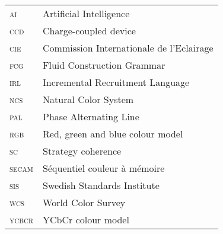 \label{abbreviations}

\setlength{\parindent}{0pt}

\begin{tabular}{ll}
\textsc{ai} &  Artificial Intelligence\\
\textsc{ccd} &  Charge-coupled device\\
\textsc{cie} &  Commission Internationale de l'Eclairage\\
\textsc{fcg} &  Fluid Construction Grammar\\
\textsc{irl} &  Incremental Recruitment Language\\
\textsc{ncs} &  Natural Color System\\
\textsc{pal} &  Phase Alternating Line\\
\textsc{rgb} &  Red, green and blue colour model\\
\textsc{sc} &  Strategy coherence\\
\textsc{secam} &  Séquentiel couleur à mémoire\\
\textsc{sis} &  Swedish Standards Institute\\
\textsc{wcs} &  World Color Survey\\
\textsc{ycbcr} &  YCbCr colour model\\
\end{tabular}

\setlength{\parindent}{10pt}
